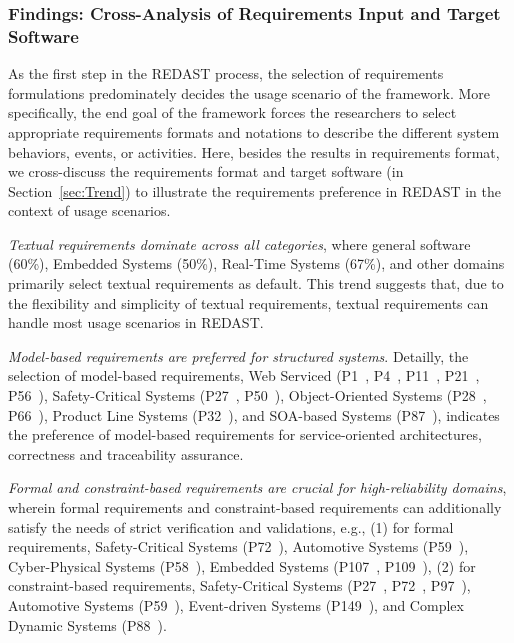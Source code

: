 \subsubsection{Findings: Cross-Analysis of Requirements Input and Target Software}
\label{sec:findings_req_target}


As the first step in the REDAST process, the selection of requirements formulations predominately decides the usage scenario of the framework. More specifically, the end goal of the framework forces the researchers to select appropriate requirements formats and notations to describe the different system behaviors, events, or activities. Here, besides the results in requirements format, we cross-discuss the requirements format and target software (in Section~\ref{sec:Trend}) to illustrate the requirements preference in REDAST in the context of usage scenarios.

\textit{Textual requirements dominate across all categories}, where general software (60\%), Embedded Systems (50\%), Real-Time Systems (67\%), and other domains primarily select textual requirements as default. This trend suggests that, due to the flexibility and simplicity of textual requirements, textual requirements can handle most usage scenarios in REDAST.

\textit{Model-based requirements are preferred for structured systems}. Detailly, the selection of model-based requirements, Web Serviced (P1~, P4~, P11~, P21~, P56~), Safety-Critical Systems (P27~, P50~), Object-Oriented Systems (P28~, P66~), Product Line Systems (P32~), and SOA-based Systems (P87~), indicates the preference of model-based requirements for service-oriented architectures, correctness and traceability assurance.

\textit{Formal and constraint-based requirements are crucial for high-reliability domains}, wherein formal requirements and constraint-based requirements can additionally satisfy the needs of strict verification and validations, e.g., (1) for formal requirements, Safety-Critical Systems (P72~), Automotive Systems (P59~), Cyber-Physical Systems (P58~), Embedded Systems (P107~, P109~), (2) for constraint-based requirements, Safety-Critical Systems (P27~, P72~, P97~), Automotive Systems (P59~), Event-driven Systems (P149~), and Complex Dynamic Systems (P88~).

